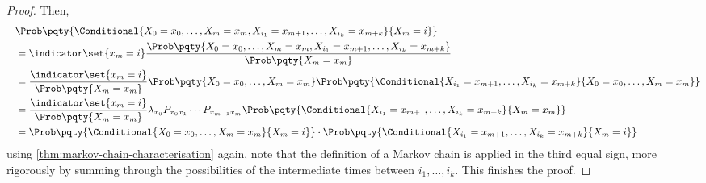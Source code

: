 \begin{proof}
    Then,
    \begin{align*}
        \phantom{=} &\Prob\pqty{\Conditional{X_0 = x_0, \ldots, X_m = x_m, X_{i_1} = x_{m + 1}, \ldots, X_{i_k} = x_{m + k}}{X_m = i}} \\
        &= \indicator\set{x_m = i} \frac{\Prob\pqty{X_0 = x_0, \ldots, X_m = x_m, X_{i_1} = x_{m + 1}, \ldots, X_{i_k} = x_{m + k}}}{\Prob\pqty{X_m = x_m}} \\
        &= \frac{\indicator\set{x_m = i}}{\Prob\pqty{X_m = x_m}} \Prob\pqty{X_0 = x_0, \ldots, X_m = x_m} \Prob\pqty{\Conditional{X_{i_1} = x_{m + 1}, \ldots, X_{i_k} = x_{m + k}}{X_0 = x_0, \ldots, X_m = x_m}} \\
        &= \frac{\indicator\set{x_m = i}}{\Prob\pqty{X_m = x_m}} \lambda_{x_0} P_{x_0 x_1} \cdots P_{x_{m - 1} x_m} \Prob\pqty{\Conditional{X_{i_1} = x_{m + 1}, \ldots, X_{i_k} = x_{m + k}}{X_m = x_m}}\\
        &= \Prob\pqty{\Conditional{X_0 = x_0, \ldots, X_m = x_m}{X_m = i}} \cdot \Prob\pqty{\Conditional{X_{i_1} = x_{m + 1}, \ldots, X_{i_k} = x_{m + k}}{X_m = i}}
    \end{align*}
    using \autoref{thm:markov-chain-characterisation} again, note that the definition of a Markov chain is applied in the third equal sign, more rigorously by summing through the possibilities of the intermediate times between \(i_1, \ldots, i_k\). This finishes the proof.
\end{proof}
